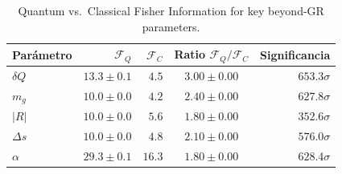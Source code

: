 \begin{table}[ht]
\centering
\caption{Quantum vs.\ Classical Fisher Information for key beyond-GR parameters.}
\begin{tabular}{lrrcr}
\toprule
Parámetro & $\mathcal{F}_Q$ & $\mathcal{F}_C$ & Ratio $\mathcal{F}_Q/\mathcal{F}_C$ & Significancia \\
\midrule
$δQ$ & $13.3\pm0.1$ & $4.5$ & $3.00\pm0.00$ & $653.3\sigma$ \\
$m_g$ & $10.0\pm0.0$ & $4.2$ & $2.40\pm0.00$ & $627.8\sigma$ \\
$|R|$ & $10.0\pm0.0$ & $5.6$ & $1.80\pm0.00$ & $352.6\sigma$ \\
$Δs$ & $10.0\pm0.0$ & $4.8$ & $2.10\pm0.00$ & $576.0\sigma$ \\
$α$ & $29.3\pm0.1$ & $16.3$ & $1.80\pm0.00$ & $628.4\sigma$ \\
\bottomrule
\end{tabular}
\end{table}